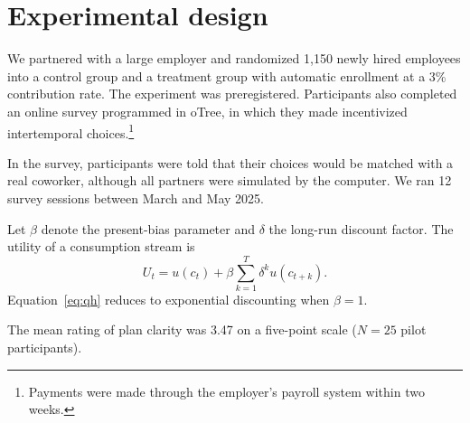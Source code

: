\section{Experimental design}
\label{sec:design}
We partnered with a large employer and randomized 1,150 newly hired employees into a control group and a treatment group with automatic enrollment at a 3\% contribution rate. The experiment was preregistered. Participants also completed an online survey programmed in oTree, in which they made incentivized intertemporal choices.\footnote{Payments were made through the employer's payroll system within two weeks.}

In the survey, participants were told that their choices would be matched with a real coworker, although all partners were simulated by the computer. We ran 12 survey sessions between March and May 2025.

Let $\beta$ denote the present-bias parameter and $\delta$ the long-run discount factor. The utility of a consumption stream is
\begin{equation}
U_t = u(c_t) + \beta \sum_{k=1}^{T} \delta^k u(c_{t+k}).
\label{eq:qh}
\end{equation}
Equation~\eqref{eq:qh} reduces to exponential discounting when $\beta = 1$.

The mean rating of plan clarity was 3.47 on a five-point scale ($N = 25$ pilot participants).

